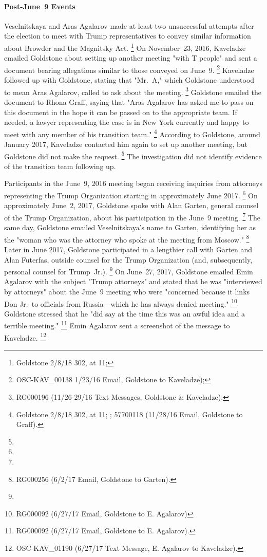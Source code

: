\paragraph{Post-June~9 Events}

Veselnitskaya and Aras Agalarov made at least two unsuccessful attempts after the election to meet with Trump representatives to convey similar information about Browder and the Magnitsky Act.%
\footnote{Goldstone 2/8/18 302, at 11; }
On November~23, 2016, Kaveladze emailed Goldstone about setting up another meeting "with T people" and sent a document bearing allegations similar to those conveyed on June~9.%
\footnote{OSC-KAV\_00138 1/23/16 Email, Goldstone to Kaveladze); }
Kaveladze followed up with Goldstone, stating that "Mr.~A," which Goldstone understood to mean Aras Agalarov, called to ask about the meeting.%
\footnote{RG000196 (11/26-29/16 Text Messages, Goldstone \& Kaveladze); }
Goldstone emailed the document to Rhona Graff, saying that "Aras Agalarov has asked me to pass on this document in the hope it can be passed on to the appropriate team.
If needed, a lawyer representing the case is in New York currently and happy to meet with any member of his transition team."%
\footnote{Goldstone 2/8/18 302, at 11; ; 57700118 (11/28/16 Email, Goldstone to Graff).}
According to Goldstone, around January 2017, Kaveladze contacted him again to set up another meeting, but Goldstone did not make the request.%
\footnote{}
The investigation did not identify evidence of the transition team following up.

Participants in the June~9, 2016 meeting began receiving inquiries from attorneys representing the Trump Organization starting in approximately June 2017.%
\footnote{}
On approximately June~2, 2017, Goldstone spoke with Alan Garten, general counsel of the Trump Organization, about his participation in the June~9 meeting.%
\footnote{}
The same day, Goldstone emailed Veselnitskaya's name to Garten, identifying her as the "woman who was the attorney who spoke at the meeting from Moscow."%
\footnote{RG000256 (6/2/17 Email, Goldstone to Garten).}
Later in June 2017, Goldstone participated in a lengthier call with Garten and Alan Futerfas, outside counsel for the Trump Organization (and, subsequently, personal counsel for Trump~Jr.).%
\footnote{}
On June~27, 2017, Goldstone emailed Emin Agalarov with the subject "Trump attorneys" and stated that he was "interviewed by attorneys" about the June~9 meeting who were "concerned because it links Don Jr.\ to officials from Russia---which he has always denied meeting."%
\footnote{RG000092 (6/27/17 Email, Goldstone to E. Agalarov)}
Goldstone stressed that he "did say at the time this was an awful idea and a terrible meeting."%
\footnote{RG000092 (6/27/17 Email, Goldstone to E. Agalarov). }
Emin Agalarov sent a screenshot of the message to Kaveladze.%
\footnote{OSC-KAV\_01190 (6/27/17 Text Message, E. Agalarov to Kaveladze).}

